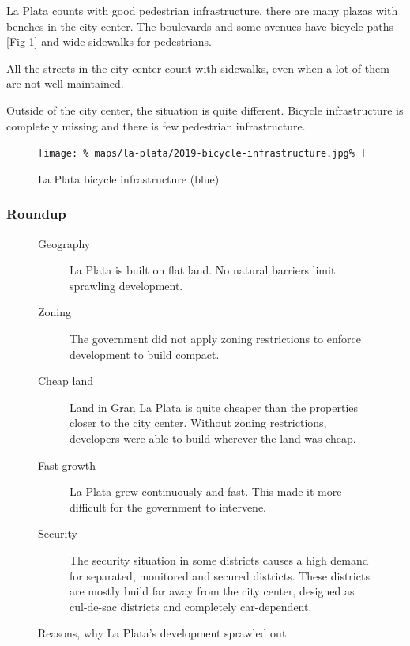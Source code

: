 \documentclass{article}
\begin{document}
\begin{multicols}{2}
			La Plata counts with good pedestrian infrastructure, there are many plazas with benches in the city center. The boulevards and some avenues have bicycle paths [Fig \ref{fig:map:la-plata-bicycle-infrastructure}] and wide sidewalks for pedestrians.
			
			All the streets in the city center count with sidewalks, even when a lot of them are not well maintained.
			
			Outside of the city center, the situation is quite different. Bicycle infrastructure is completely missing and there is few pedestrian infrastructure.
			
			\begin{figure}[H]
				\texttt{[image: \%
					maps/la-plata/2019-bicycle-infrastructure.jpg\%
				]}
				\caption{La Plata bicycle infrastructure (blue)  \cite{OpenCycleMap:LaPlata}}
				\label{fig:map:la-plata-bicycle-infrastructure}
			\end{figure}
			
			
			\subsubsection{Roundup}
			
			\begin{figure}[H]
				\begin{description}
					\item [Geography] La Plata is built on flat land. No natural barriers limit sprawling development.
					\item [Zoning] The government did not apply zoning restrictions to enforce development to build compact.
					\item [Cheap land] Land in Gran La Plata is quite cheaper than the properties closer to the city center. Without zoning restrictions, developers were able to build wherever the land was cheap.
					\item [Fast growth] La Plata grew continuously and fast. This made it more difficult for the government to intervene.
					\item [Security] The security situation in some districts causes a high demand for separated, monitored and secured districts. These districts are mostly build far away from the city center, designed as cul-de-sac districts and completely car-dependent.
				\end{description}
				\caption{Reasons, why La Plata's development sprawled out}
				\label{fig:list:la-plata-development-reasons}
			\end{figure}
			

\end{multicols}
\end{document}
